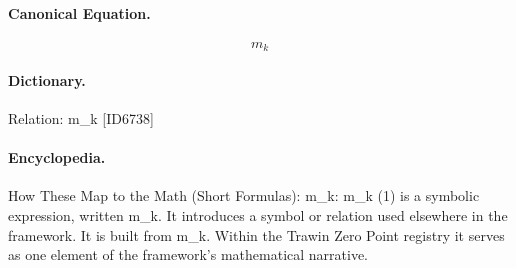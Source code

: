 \paragraph{Canonical Equation.}
\[
m_k
\]

\paragraph{Dictionary.}
Relation: m\_k [ID6738]

\paragraph{Encyclopedia.}
How These Map to the Math (Short Formulas): m\_k: m\_k (1) is a symbolic expression, written m\_k. It introduces a symbol or relation used elsewhere in the framework. It is built from m\_k. Within the Trawin Zero Point registry it serves as one element of the framework's mathematical narrative.
